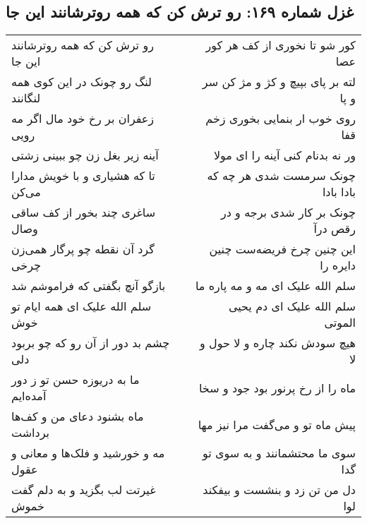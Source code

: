 \begin{center}
\section*{غزل شماره ۱۶۹: رو ترش کن که همه روترشانند این جا}
\label{sec:0169}
\begin{longtable}{l p{0.5cm} r}
رو ترش کن که همه روترشانند این جا
&&
کور شو تا نخوری از کف هر کور عصا
\\
لنگ رو چونک در این کوی همه لنگانند
&&
لته بر پای بپیچ و کژ و مژ کن سر و پا
\\
زعفران بر رخ خود مال اگر مه رویی
&&
روی خوب ار بنمایی بخوری زخم قفا
\\
آینه زیر بغل زن چو ببینی زشتی
&&
ور نه بدنام کنی آینه را ای مولا
\\
تا که هشیاری و با خویش مدارا می‌کن
&&
چونک سرمست شدی هر چه که بادا بادا
\\
ساغری چند بخور از کف ساقی وصال
&&
چونک بر کار شدی برجه و در رقص درآ
\\
گرد آن نقطه چو پرگار همی‌زن چرخی
&&
این چنین چرخ فریضه‌ست چنین دایره را
\\
بازگو آنچ بگفتی که فراموشم شد
&&
سلم الله علیک ای مه و مه پاره ما
\\
سلم الله علیک ای همه ایام تو خوش
&&
سلم الله علیک ای دم یحیی الموتی
\\
چشم بد دور از آن رو که چو بربود دلی
&&
هیچ سودش نکند چاره و لا حول و لا
\\
ما به دریوزه حسن تو ز دور آمده‌ایم
&&
ماه را از رخ پرنور بود جود و سخا
\\
ماه بشنود دعای من و کف‌ها برداشت
&&
پیش ماه تو و می‌گفت مرا نیز مها
\\
مه و خورشید و فلک‌ها و معانی و عقول
&&
سوی ما محتشمانند و به سوی تو گدا
\\
غیرتت لب بگزید و به دلم گفت خموش
&&
دل من تن زد و بنشست و بیفکند لوا
\\
\end{longtable}
\end{center}
